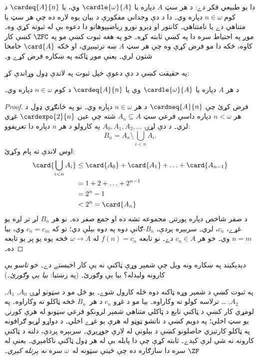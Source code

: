 \documentclass[../../../include/open-logic-section]{subfiles}
\begin{document}
\begin{ex}
دا يو طبيعي فکر دے: د هر سټ $A$ دپاره يا
$\cardle{\omega}{A}$ وي، يا
$\cardeq{A}{n}$ د کوم $n \in \omega$
دپاره وي۔ دا د دې وجداني مفکورې د بيان يوه
لاره ده چې هر سټ يا متناهي دے يا نامتناهي۔
کانتور او ډېرو نورو رياضيپوهانو دا دعوه بې له
ثبوته کړې وه۔ موږ په احتياط سره دا په
کښې ثابته کړه۔ خو په هغه ثبوت کښې مو په
$\ZFC$ کښې کار کاوه، ځکه دا مو فرض کړې
وه چې هر سټ $A$ ښه ترتيبېږي، او ځکه
$\card{A}$ خامخا شتون لري۔ يعنې موږ
ټاکنه په ښکاره فرض کړے و۔

په حقيقت کښې \citet{Dedekind1888} د
دې دعوې خپل ثبوت په لاندې ډول وړاندې کړ:

\begin{thm}
د هر $A$ دپاره يا $\cardle{\omega}{A}$
وي يا $\cardeq{A}{n}$ د کوم
$n \in \omega$ دپاره وي۔
\end{thm}

\begin{proof}
فرض کړئ چې $\cardneq{A}{n}$ د هر
$n \in \omega$ دپاره وي۔ نو په ځانګړي
ډول د هر $n < \omega$ دپاره داسې
فرعي سټ $A_n \subseteq A$ شته چې
عين $\cardexpo{2}{n}$ غړي لري۔ د دې
لړۍ $A_0, A_1, A_2,
\ldots$ په کارولو د هر $n$ دپاره دا
تعريفوو:
\[
	B_n = A_n \setminus \bigcup_{i < n} A_i.
\]
اوس لاندې ته پام وکړئ:
\begin{align*}
	\card{\bigcup_{i < n}A_i} 
	&\leq \card{A_0} + \card{A_1} + \ldots + \card{A_{n-1}}\\
	&=1 + 2 + \ldots + 2^{n-1}\\
	& = 2^n - 1\\
	& < 2^n = \card{A_n}
\end{align*}
د صفر شاخص دپاره پورتنۍ مجموعه تشه ده او جمع صفر ده۔
نو هر $B_n$ لږ تر لږه يو غړے،
$c_n$، لري۔ سربېره پردې، $B_n$-ګانې
دوه په دوه بېلې دي؛ نو که $c_n = c_m$
وي، بيا $n = m$ وي۔ خو هر
$c_n
\in A$ دے۔ نو تابعه $f(n) = c_n$
له $\omega \to A$ څخه يوه يو پر يو
تابعه ده۔
\end{proof}
\noindent
دېدېکيند په ښکاره ونه ويل چې شمېر وړې ټاکنې نه يې کار اخيستے دے۔ خو \emph{تاسو} يې
کارونه وليدله؟ بيا يې وګورئ۔ (په رښتيا:
\emph{بيا يې وګورئ}۔)

په ثبوت کښې د شمېر وړه ټاکنه دوه ځله
کارول شوے۔ يو ځل مو د سټونو لړۍ
$A_0$, $A_1$, $A_2$, \dots\@
ترلاسه کولو ته وکاراوه۔ بيا مو د غړو
$c_n$ د هر~$B_n$ څخه ټاکلو ته وکاراوه۔ په لومړي
کار کښې د ټاکنې تابع د ټاکلي متناهي شمېر لرونکو فرعي
سټونو له هرې کورنۍ يو سټ اخلي؛ په دويم کښې د ناتشو
ټوټو له هرې يو غړے اخلي۔ د دواړو لړيو ګرافونه په ټاکلو
کارتيزي حاصلونو کښې د بېلونې له لارې جوړېږي۔
سربېره پردې، دلته د ټاکنې کارونه نه شي
لرې کېدے۔ \citet[p.~138]{Cohen1966}
ثابته کړې چې دا پايله بې له هر ډول
ټاکنې ناکامېږي۔ يعنې له $\ZF$ سره
دا سازګاره ده چې ځينې سټونه له~$\omega$
سره \emph{نه پرتله کېږي}۔
\end{ex}
\end{document}
